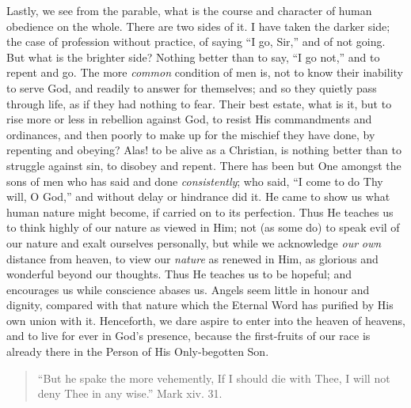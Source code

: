 Lastly, we see from the parable, what is the course
and character of human obedience on the whole. There are
two sides of it. I have taken the darker side; the case
of profession without practice, of saying ``I go,
Sir,'' and of not going. But what is the brighter
side? Nothing better than to say, ``I go not,''
and to repent and go. The more \emph{common} condition of
men is, not to know their inability to serve God, and
readily to answer for themselves; and so they quietly
pass through life, as if they had nothing to fear. Their
best estate, what is it, but to rise more or less in
rebellion against God, to resist His commandments and
ordinances, and then poorly to make up for the mischief
they have done, by repenting and obeying? Alas! to be
alive as a Christian, is nothing better than to struggle
against sin, to disobey and repent. There has been but
One amongst the sons of men who has said and done \emph{consistently};
who said, ``I come to do Thy will, O God,'' and
without delay or hindrance did it. He came to show us
what human nature might become, if carried on to its
perfection. Thus He teaches us to think highly of our
nature as viewed in Him; not (as some do) to speak evil
of our nature and exalt ourselves personally, but while
we acknowledge \emph{our} \emph{own} distance from
heaven, to view our \emph{nature} as renewed in Him, as
glorious and wonderful beyond our thoughts. Thus He
teaches us to be hopeful; and encourages us while
conscience abases us. Angels seem little in honour and
dignity, compared with that nature which the Eternal Word
has purified by His own union with it. Henceforth, we
dare aspire to enter into the heaven of heavens, and to
live for ever in God's presence, because the first-fruits
of our race is already there in the Person of His
Only-begotten Son.


\begin{quote}

``But he spake the more vehemently, If I
should die with Thee, I will not deny Thee in any
wise.'' Mark xiv. 31.

\end{quote}

